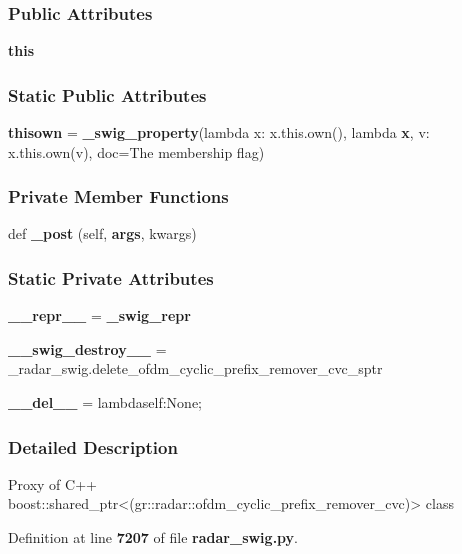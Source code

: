\subsubsection*{Public Attributes}
\begin{DoxyCompactItemize}
\item 
{\bf this}
\end{DoxyCompactItemize}
\subsubsection*{Static Public Attributes}
\begin{DoxyCompactItemize}
\item 
{\bf thisown} = {\bf \+\_\+swig\+\_\+property}(lambda x\+: x.\+this.\+own(), lambda {\bf x}, v\+: x.\+this.\+own(v), doc=\textquotesingle{}The membership flag\textquotesingle{})
\end{DoxyCompactItemize}
\subsubsection*{Private Member Functions}
\begin{DoxyCompactItemize}
\item 
def {\bf \+\_\+post} (self, {\bf args}, kwargs)
\end{DoxyCompactItemize}
\subsubsection*{Static Private Attributes}
\begin{DoxyCompactItemize}
\item 
{\bf \+\_\+\+\_\+repr\+\_\+\+\_\+} = {\bf \+\_\+swig\+\_\+repr}
\item 
{\bf \+\_\+\+\_\+swig\+\_\+destroy\+\_\+\+\_\+} = \+\_\+radar\+\_\+swig.\+delete\+\_\+ofdm\+\_\+cyclic\+\_\+prefix\+\_\+remover\+\_\+cvc\+\_\+sptr
\item 
{\bf \+\_\+\+\_\+del\+\_\+\+\_\+} = lambdaself\+:\+None;
\end{DoxyCompactItemize}


\subsubsection{Detailed Description}
\begin{DoxyVerb}Proxy of C++ boost::shared_ptr<(gr::radar::ofdm_cyclic_prefix_remover_cvc)> class\end{DoxyVerb}
 

Definition at line {\bf 7207} of file {\bf radar\+\_\+swig.\+py}.



